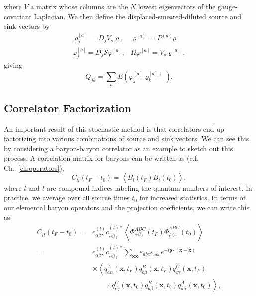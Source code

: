 where $V$ a matrix whose columns are the $N$ lowest eigenvectors of the gauge-covariant Laplacian. We then define the displaced-smeared-diluted source and sink vectors by
\begin{equation}
    \begin{array}{ll}
        \varrho_{j}^{[a]}=D_{j} V_{s} \varrho, & \varrho^{[a]}=P^{(a)} \rho \\
        \varphi_{j}^{[a]}=D_{j} \mathcal{S} \varphi^{[a]}, & \Omega \varphi^{[a]}=V_{s} \varrho^{[a]},
        \end{array}
\end{equation}
giving
\begin{equation}\label{eq:Qjk}
    Q_{j k}=\sum_{a} E\left(\varphi_{j}^{[a]} \varrho_{k}^{[a] \dagger}\right).
\end{equation}
\subsection{Correlator Factorization}
An important result of this stochastic method is that correlators end up factorizing into various combinations of source and sink vectors. We can see this by considering a baryon-baryon correlator as an example to sketch out this process. A correlation matrix for baryons can be written as (c.f. Ch.~\ref{ch:operators}),
\begin{equation}
    C_{l \overline{l}}\left(t_{F}-t_{0}\right)=\left\langle B_{l}\left(t_{F}\right) \overline{B}_{\overline{l}}\left(t_{0}\right)\right\rangle,
\end{equation}
where $l$ and $\overline l$ are compound indices labeling the quantum numbers of interest. In practice, we average over all source times $t_0$ for increased statistics. In terms of our elemental baryon operators and the projection coefficients, we can write this as
\begin{equation}
    \begin{aligned}
    C_{l \overline{l}}\left(t_{F}-t_{0}\right)=&c_{\alpha \beta \gamma}^{(l)} c_{\overline{\alpha} \overline{\beta} \overline{\gamma}}^{(\overline{l}) *}\left\langle\Phi_{\alpha \beta \gamma}^{A B C}\left(t_{F}\right) \overline{\Phi}_{\overline{\alpha} \overline{\beta} \overline{\gamma}}^{\overline{A B C}}\left(t_{0}\right)\right\rangle \\
    =&c_{\alpha \beta \gamma}^{(l)} c_{\overline{\alpha} \overline{\beta} \overline{\gamma}}^{(\overline{l}) *} \sum_{\boldsymbol{x} \overline{\boldsymbol{x}}} \varepsilon_{a b c} \varepsilon_{\overline{a} \overline{b} \overline{c}} e^{-i \boldsymbol{p} \cdot(\boldsymbol{x}-\overline{\boldsymbol{x}})}\\
    &\times\left\langle q_{a \alpha}^{A}\left(\boldsymbol{x}, t_{F}\right) q_{b \beta}^{B}\left(\boldsymbol{x}, t_{F}\right) q_{c \gamma}^{C}\left(\boldsymbol{x}, t_{F}\right)\right.\\
    &\qquad\left.\times \overline{q}_{\overline{c \gamma}}^{\overline{C}}\left(\overline{\boldsymbol{x}}, t_{0}\right) \overline{q}_{\overline{b} \beta}^{\overline{B}}\left(\overline{\boldsymbol{x}}, t_{0}\right) \overline{q}_{\overline{a} \overline{\alpha}}^{\overline{A}}\left(\overline{\boldsymbol{x}}, t_{0}\right)\right\rangle,
    \end{aligned}
\end{equation}
